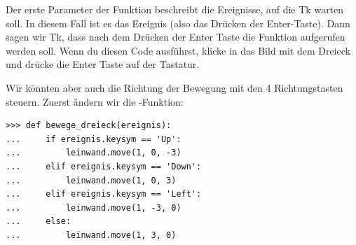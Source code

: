 Der erste Parameter der  Funktion beschreibt die Ereignisse, auf die Tk warten soll. In diesem Fall ist es das Ereignis  (also das Drücken der Enter-Taste). Dann sagen wir Tk, dass nach dem Drücken der Enter Taste die Funktion  aufgerufen werden soll. Wenn du diesen Code ausführst, klicke in das Bild mit dem Dreieck und drücke die Enter Taste auf der Tastatur.

Wir könnten aber auch die Richtung der Bewegung mit den 4 Richtungstasten steuern. Zuerst ändern wir die -Funktion:

\begin{Verbatim}[frame=single]
>>> def bewege_dreieck(ereignis):
...     if ereignis.keysym == 'Up':
...         leinwand.move(1, 0, -3)
...     elif ereignis.keysym == 'Down':
...         leinwand.move(1, 0, 3)
...     elif ereignis.keysym == 'Left':
...         leinwand.move(1, -3, 0)
...     else:
...         leinwand.move(1, 3, 0)
\end{Verbatim}

